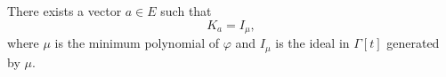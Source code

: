 There exists a vector $a \in E$ such that
$$K_a = I_{\mu},$$
where $\mu$ is the minimum polynomial of $\varphi$ and $I_{\mu}$ is the ideal in $\Gamma[t]$ generated by $\mu$.
